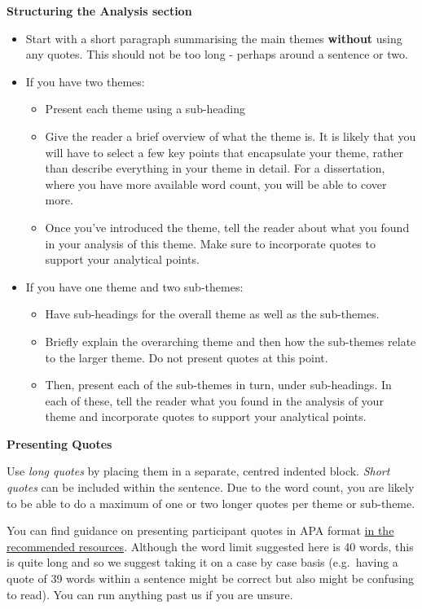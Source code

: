 \documentclass[
  english,
  letterpaper,
  DIV=11,
  numbers=noendperiod]{scrreprt}
\providecommand{\tightlist}{%
  \setlength{\itemsep}{0pt}\setlength{\parskip}{0pt}}
\begin{document}
\textbf{Structuring the Analysis section}

\begin{itemize}
\tightlist
\item
  Start with a short paragraph summarising the main themes
  \textbf{without} using any quotes. This should not be too long -
  perhaps around a sentence or two.
\item
  If you have two themes:

  \begin{itemize}
  \tightlist
  \item
    Present each theme using a sub-heading
  \item
    Give the reader a brief overview of what the theme is. It is likely
    that you will have to select a few key points that encapsulate your
    theme, rather than describe everything in your theme in detail. For
    a dissertation, where you have more available word count, you will
    be able to cover more.
  \item
    Once you've introduced the theme, tell the reader about what you
    found in your analysis of this theme. Make sure to incorporate
    quotes to support your analytical points.
  \end{itemize}
\item
  If you have one theme and two sub-themes:

  \begin{itemize}
  \tightlist
  \item
    Have sub-headings for the overall theme as well as the sub-themes.
  \item
    Briefly explain the overarching theme and then how the sub-themes
    relate to the larger theme. Do not present quotes at this point.
  \item
    Then, present each of the sub-themes in turn, under sub-headings. In
    each of these, tell the reader what you found in the analysis of
    your theme and incorporate quotes to support your analytical points.
  \end{itemize}
\end{itemize}

\textbf{Presenting Quotes}

Use \emph{long quotes} by placing them in a separate, centred indented
block. \emph{Short quotes} can be included within the sentence. Due to
the word count, you are likely to be able to do a maximum of one or two
longer quotes per theme or sub-theme.

You can find guidance on presenting participant quotes in APA format
\href{https://apastyle.apa.org/style-grammar-guidelines/citations/quoting-participants}{in
the recommended resources}. Although the word limit suggested here is 40
words, this is quite long and so we suggest taking it on a case by case
basis (e.g.~having a quote of 39 words within a sentence might be
correct but also might be confusing to read). You can run anything past
us if you are unsure.
\end{document}
